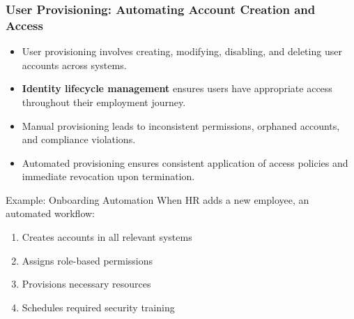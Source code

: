 \documentclass{beamer}
\begin{document}
\begin{frame}
  \frametitle{User Provisioning: Automating Account Creation and Access}
  
  \begin{itemize}
    \item User provisioning involves creating, modifying, disabling, and deleting user accounts across systems.
    \item \textbf{Identity lifecycle management} ensures users have appropriate access throughout their employment journey.
    \item Manual provisioning leads to inconsistent permissions, orphaned accounts, and compliance violations.
    \item Automated provisioning ensures consistent application of access policies and immediate revocation upon termination.
  \end{itemize}
  
  \begin{exampleblock}{Example: Onboarding Automation}
    \scriptsize
    When HR adds a new employee, an automated workflow:
    \begin{enumerate}
      \item Creates accounts in all relevant systems
      \item Assigns role-based permissions
      \item Provisions necessary resources
      \item Schedules required security training
    \end{enumerate}
  \end{exampleblock}
\end{frame}
\end{document}
